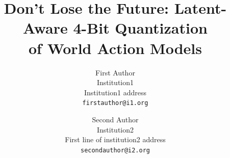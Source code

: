 \documentclass[10pt,twocolumn,letterpaper]{article}
\title{Don't Lose the Future: Latent-Aware 4-Bit Quantization\\of World Action Models}
\author{First Author\\
Institution1\\
Institution1 address\\
{\tt\small firstauthor@i1.org}
\and
Second Author\\
Institution2\\
First line of institution2 address\\
{\tt\small secondauthor@i2.org}
}
\begin{document}
\maketitle








{
    \small
    
    
}


\end{document}
